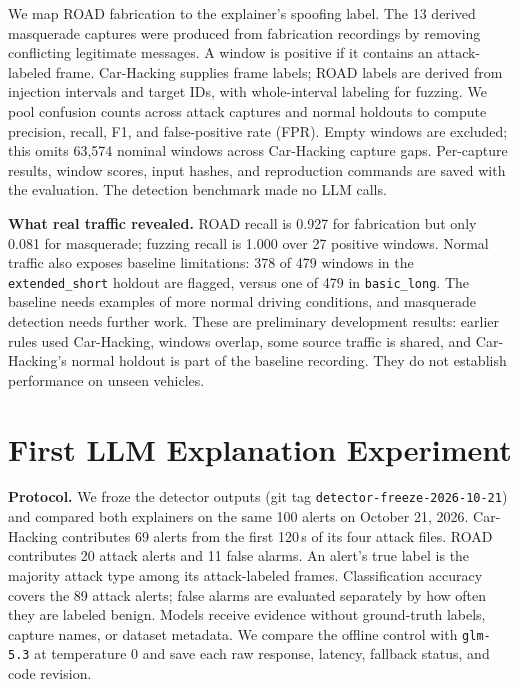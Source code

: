 \documentclass[sigconf]{acmart}
\begin{document}
We map ROAD fabrication to the explainer's spoofing label. The 13 derived masquerade captures were produced from fabrication recordings by removing conflicting legitimate messages. A window is positive if it contains an attack-labeled frame. Car-Hacking supplies frame labels; ROAD labels are derived from injection intervals and target IDs, with whole-interval labeling for fuzzing. We pool confusion counts across attack captures and normal holdouts to compute precision, recall, F1, and false-positive rate (FPR). Empty windows are excluded; this omits 63,574 nominal windows across Car-Hacking capture gaps. Per-capture results, window scores, input hashes, and reproduction commands are saved with the evaluation. The detection benchmark made no LLM calls.

\textbf{What real traffic revealed.} ROAD recall is 0.927 for fabrication but only 0.081 for masquerade; fuzzing recall is 1.000 over 27 positive windows. Normal traffic also exposes baseline limitations: 378 of 479 windows in the \texttt{extended\_short} holdout are flagged, versus one of 479 in \texttt{basic\_long}. The baseline needs examples of more normal driving conditions, and masquerade detection needs further work. These are preliminary development results: earlier rules used Car-Hacking, windows overlap, some source traffic is shared, and Car-Hacking's normal holdout is part of the baseline recording. They do not establish performance on unseen vehicles.

\section{First LLM Explanation Experiment}\label{sec:explain}
\textbf{Protocol.} We froze the detector outputs (git tag \texttt{detector-freeze-}\allowbreak\texttt{2026-10-21}) and compared both explainers on the same 100 alerts on October 21, 2026. Car-Hacking contributes 69 alerts from the first 120\,s of its four attack files. ROAD contributes 20 attack alerts and 11 false alarms. An alert's true label is the majority attack type among its attack-labeled frames. Classification accuracy covers the 89 attack alerts; false alarms are evaluated separately by how often they are labeled benign. Models receive evidence without ground-truth labels, capture names, or dataset metadata. We compare the offline control with \texttt{glm-5.3} at temperature 0 and save each raw response, latency, fallback status, and code revision.
\end{document}
